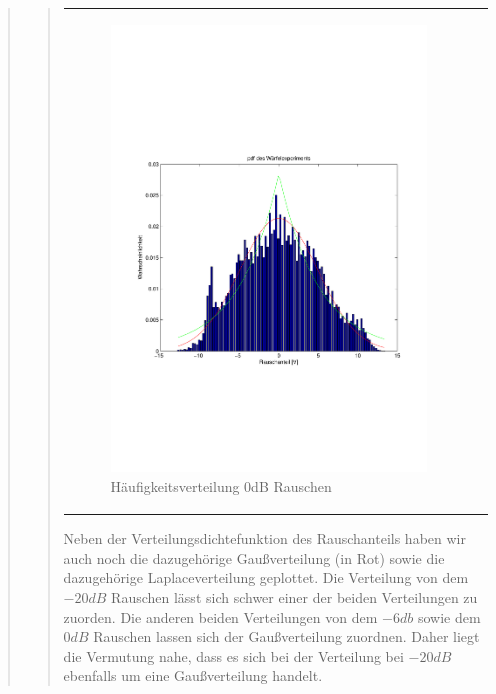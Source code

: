 \begin{quote}
\begin{quote}
\begin{center}
\begin{tabular}{ll}
                   \begin{minipage}{0.6\textwidth}
                       \begin{figure}[H] 
                           \includegraphics[scale=0.49, trim = 10mm 65mm 10mm 85mm, clip]{./Bilder/PDFRauschen0dB}
                           \caption{Häufigkeitsverteilung 0dB Rauschen}
                       \end{figure}
        
                   \end{minipage}
        
               \end{tabular}
               \end{center}

        
        Neben der Verteilungsdichtefunktion des Rauschanteils haben wir auch noch die dazugehörige Gaußverteilung (in
        Rot) sowie die dazugehörige Laplaceverteilung geplottet. Die Verteilung von dem $-20dB$ Rauschen lässt sich
        schwer einer der beiden Verteilungen zu zuorden. Die anderen beiden Verteilungen von dem $-6db$ sowie dem $0dB$
        Rauschen lassen sich der Gaußverteilung zuordnen. Daher liegt die Vermutung nahe, dass es sich bei der
        Verteilung bei $-20dB$ ebenfalls um eine Gaußverteilung handelt. \vspace{1em}
        

\end{quote}
\end{quote}
